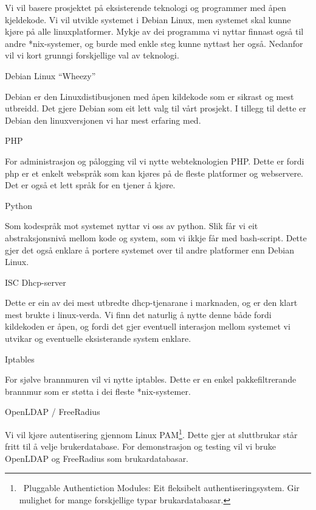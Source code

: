 \documentclass[12pt]{article}
\begin{document}
Vi vil basere prosjektet på eksisterende teknologi og programmer med åpen kjeldekode. Vi vil utvikle systemet i Debian Linux, men systemet skal kunne kjøre på alle linuxplatformer. Mykje av dei programma vi nyttar finnast også til andre *nix-systemer, og burde med enkle steg kunne nyttast her også. Nedanfor vil vi kort grunngi forskjellige val av teknologi. 




Debian Linux “Wheezy”

Debian er den Linuxdistibusjonen med åpen kildekode som er sikrast og mest utbreidd. Det gjere Debian som eit lett valg til vårt prosjekt. I tillegg til dette er Debian den linuxversjonen vi har mest erfaring med.




PHP

For administrasjon og pålogging vil vi nytte webteknologien PHP. Dette er fordi php er et enkelt webspråk som kan kjøres på de fleste platformer og webservere. Det er også et lett språk for en tjener å kjøre.




Python

Som kodespråk mot systemet nyttar vi oss av python. Slik får vi eit abstraksjonsnivå mellom kode og system, som vi ikkje får med bash-script. Dette gjer det også enklare å portere systemet over til andre platformer enn Debian Linux. 




ISC Dhcp{}-server

Dette er ein av dei mest utbredte dhcp-tjenarane i marknaden, og er den klart mest brukte i linux-verda. Vi finn det naturlig å nytte denne både fordi kildekoden er åpen, og fordi det gjer eventuell interasjon mellom systemet vi utvikar og eventuelle eksisterande system enklare. 




Iptables

For sjølve brannmuren vil vi nytte iptables. Dette er en enkel pakkefiltrerande brannmur som er støtta i dei fleste *nix-systemer. 




OpenLDAP / FreeRadius

Vi vil kjøre autentisering gjennom Linux PAM\footnote{\ Pluggable Authentiction Modules: Eit fleksibelt authentiseringsystem. Gir mulighet for mange forskjellige typar brukardatabasar.}. Dette gjer at sluttbrukar står fritt til å velje brukerdatabase. For demonstrasjon og testing vil vi bruke OpenLDAP og FreeRadius som brukardatabasar.
\end{document}
